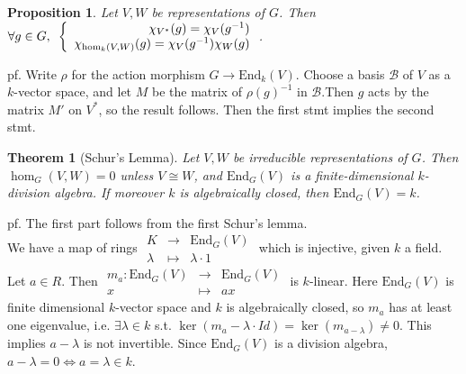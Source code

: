 \documentclass[12pt,letterpaper]{report}
\newtheorem{theorem}{Theorem}[section]
\newtheorem{proposition}{Proposition}[section]
\begin{document}
\begin{proposition}Let $V,W$ be representations of $G$. Then $\forall g\in G,\,\,\,\\\left\{\begin{array}{r}\chi_{V^{*}}(g)=\chi_{V}(g^{-1})\\\chi_{\hom_{k}(V,W)}(g)=\chi_{V}(g^{-1})\chi_{W}(g)\end{array}\right.$.\end{proposition}
pf. Write $\rho$ for the action morphism $G\rightarrow\text{End}_{k}(V)$. Choose a basis $\mathcal{B}$ of $V$ as a $k$-vector space, and let $M$ be the matrix of $\rho(g)^{-1}$ in $\mathcal{B}$.Then $g$ acts by the matrix $M'$ on $V^{*}$, so the result follows. Then the first stmt implies the second stmt. 
\begin{theorem}[Schur's Lemma]Let $V,W$ be irreducible representations of $G$. Then $\hom_{G}(V,W)=0$ unless $V\cong W$, and $\text{End}_{G}(V)$ is a finite-dimensional $k$-division algebra. If moreover $k$ is algebraically closed, then $\text{End}_{G}(V)=k$.\end{theorem}
pf. The first part follows from the first Schur's lemma.
\\We have a map of rings $\begin{array}{rrr}K&\rightarrow&\text{End}_{G}(V)\\\lambda&\mapsto&\lambda\cdot 1\end{array}$ which is injective, given $k$ a field. Let $a\in R$. Then $\begin{array}{rrr}m_{a}:\text{End}_{G}(V)&\rightarrow&\text{End}_{G}(V)\\x&\mapsto&ax\end{array}$ is $k$-linear. Here $\text{End}_{G}(V)$ is finite dimensional $k$-vector space and $k$ is algebraically closed, so $m_{a}$ has at least one eigenvalue, i.e. $\exists \lambda\in k$ s.t. $\ker(m_{a}-\lambda\cdot Id)=\ker(m_{a-\lambda})\neq0$. This implies $a-\lambda$ is not invertible. Since $\text{End}_{G}(V)$ is a division algebra, $a-\lambda=0\Leftrightarrow a=\lambda\in k$.  
\end{document}
